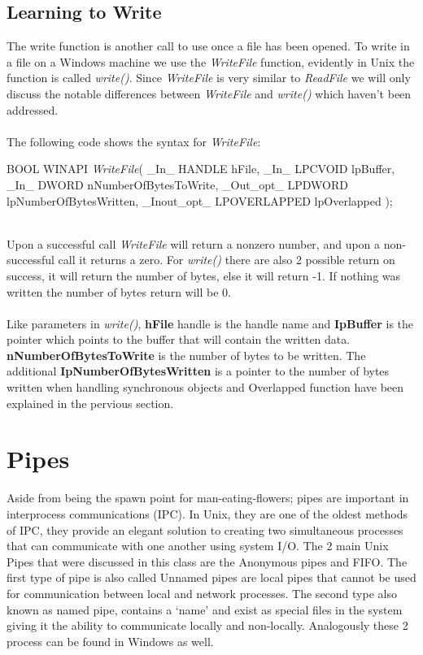 \documentclass[a4paper]{article}
\begin{document}
\subsection{Learning to Write}
The write function is another call to use once a file has been opened. To write in a file on a Windows machine we use the \textit{WriteFile} function, evidently in Unix the function is called \textit{write()}. Since \textit{WriteFile} is very similar to \textit{ReadFile} we will only discuss the notable differences between \textit{WriteFile} and \textit{write()} which haven’t been addressed.\\
\\
The following code shows the syntax for \textit{WriteFile}:\\
\begin{code}

		BOOL WINAPI \textit{WriteFile}(
 			_In_         HANDLE hFile,
			_In_         LPCVOID lpBuffer,
			_In_         DWORD nNumberOfBytesToWrite,
			_Out_opt_    LPDWORD lpNumberOfBytesWritten,
			_Inout_opt_  LPOVERLAPPED lpOverlapped
		);
        
\end{code}\\

Upon a successful call \textit{WriteFile} will return a nonzero number, and upon a non-successful call it returns a zero. For \textit{write()} there are also 2 possible return on success, it will return the number of bytes, else it will return -1. If nothing was written the number of bytes return will be 0. \\
\\
Like parameters in \textit{write()},  \textbf{hFile} handle is the handle name and \textbf{IpBuffer} is the pointer which points to the buffer that will contain the written data. \textbf{nNumberOfBytesToWrite} is the number of bytes to be written. The additional \textbf{IpNumberOfBytesWritten} is a pointer to the number of bytes written when handling synchronous objects and Overlapped function have been explained in the pervious section.
\section{Pipes }
Aside from being the spawn point for man-eating-flowers; pipes are important in interprocess communications (IPC). In Unix, they are one of the oldest methods of IPC, they provide an elegant solution to creating two simultaneous processes that can communicate with one another using system I/O. The 2 main Unix Pipes that were discussed in this class are the Anonymous pipes and FIFO. The first type of pipe is also called Unnamed pipes are local pipes that cannot be used for communication between local and network processes. The second type also known as named pipe, contains a ‘name’ and exist as special files in the system giving it the ability to communicate locally and non-locally.  Analogously these 2 process can be found in Windows as well.
\end{document}
